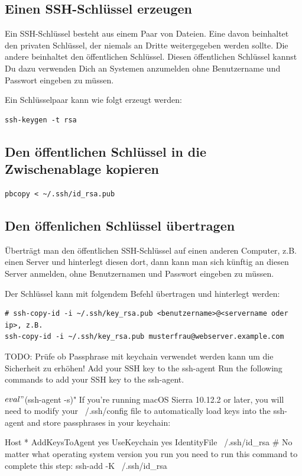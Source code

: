 \documentclass[]{article}
\begin{document}
\subsection{Einen SSH-Schlüssel erzeugen}
Ein SSH-Schlüssel besteht aus einem Paar von Dateien. Eine davon beinhaltet den privaten Schlüssel, der niemals an Dritte weitergegeben werden sollte. Die andere beinhaltet den öffentlichen Schlüssel. Diesen öffentlichen Schlüssel kannst Du dazu verwenden Dich an Systemen anzumelden ohne Benutzername und Passwort eingeben zu müssen.

Ein Schlüsselpaar kann wie folgt erzeugt werden:
\begin{verbatim}
ssh-keygen -t rsa
\end{verbatim}

\subsection{Den öffentlichen Schlüssel in die Zwischenablage kopieren}
\begin{verbatim}
pbcopy < ~/.ssh/id_rsa.pub
\end{verbatim}

\subsection{Den öffenlichen Schlüssel übertragen}
Überträgt man den öffentlichen SSH-Schlüssel auf einen anderen Computer, z.B. einen Server und hinterlegt diesen dort, dann kann man sich künftig an diesen Server anmelden, ohne Benutzernamen und Passwort eingeben zu müssen.

Der Schlüssel kann mit folgendem Befehl übertragen und hinterlegt werden:
\begin{verbatim}
# ssh-copy-id -i ~/.ssh/key_rsa.pub <benutzername>@<servername oder ip>, z.B.
ssh-copy-id -i ~/.ssh/key_rsa.pub musterfrau@webserver.example.com
\end{verbatim}

TODO: Prüfe ob Passphrase mit keychain verwendet werden kann um die Sicherheit zu erhöhen!
Add your SSH key to the ssh-agent
Run the following commands to add your SSH key to the ssh-agent.

$ eval "$(ssh-agent -s)"
If you're running macOS Sierra 10.12.2 or later, you will need to modify your ~/.ssh/config file to automatically load keys into the ssh-agent and store passphrases in your keychain:

Host *
AddKeysToAgent yes
UseKeychain yes
IdentityFile ~/.ssh/id\_rsa
# No matter what operating system version you run you need to run this command to complete this step:
ssh-add -K ~/.ssh/id\_rsa
\end{document}
